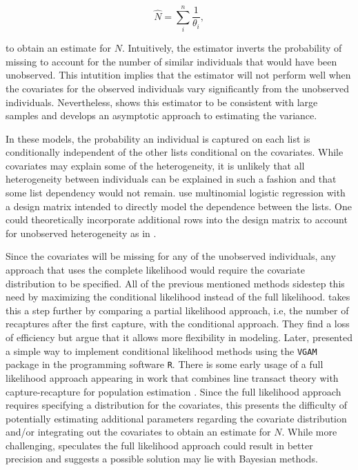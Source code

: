\documentclass[
  12pt,
]{article}
\begin{document}
\begin{equation*}
\hat{N} = \sum_i^n \frac{1}{\theta_i},
\end{equation*}

to obtain an estimate for \(N\). Intuitively, the estimator inverts the
probability of missing to account for the number of similar individuals
that would have been unobserved. This intutition implies that the
estimator will not perform well when the covariates for the observed
individuals vary significantly from the unobserved individuals.
Nevertheless, \cite{alho_logistic_1990} shows this estimator to be
consistent with large samples and develops an asymptotic approach to
estimating the variance.

In these models, the probability an individual is captured on each list
is conditionally independent of the other lists conditional on the
covariates. While covariates may explain some of the heterogeneity, it
is unlikely that all heterogeneity between individuals can be explained
in such a fashion and that some list dependency would not remain.
\cite{zwane_population_2005} use multinomial logistic regression with a
design matrix intended to directly model the dependence between the
lists. One could theoretically incorporate additional rows into the
design matrix to account for unobserved heterogeneity as in
\cite{darroch_three-sample_1993}.

Since the covariates will be missing for any of the unobserved
individuals, any approach that uses the complete likelihood would
require the covariate distribution to be specified. All of the previous
mentioned methods sidestep this need by maximizing the conditional
likelihood instead of the full likelihood.
\cite{stoklosa_heterogeneous_2011} takes this a step further by
comparing a partial likelihood approach, i.e, the number of recaptures
after the first capture, with the conditional approach. They find a loss
of efficiency but argue that it allows more flexibility in modeling.
Later, \cite{yee_vgam_2015} presented a simple way to implement
conditional likelihood methods using the \texttt{VGAM} package in the
programming software \texttt{R}. There is some early usage of a full
likelihood approach appearing in work that combines line transact theory
with capture-recapture for population estimation
\citep{alpizar-jara_combination_1996,borchers_mark-recapture_1998}.
Since the full likelihood approach requires specifying a distribution
for the covariates, this presents the difficulty of potentially
estimating additional parameters regarding the covariate distribution
and/or integrating out the covariates to obtain an estimate for \(N\).
While more challenging, \cite{pollock_use_2002} speculates the full
likelihood approach could result in better precision and suggests a
possible solution may lie with Bayesian methods.
\end{document}
